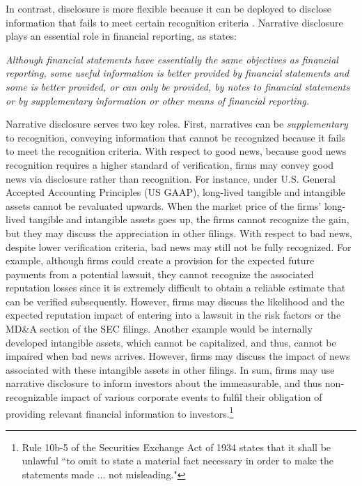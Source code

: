 \documentclass[letterpaper,12pt]{article}
\begin{document}
\begin{spacing}{1.5}
In contrast, disclosure is more flexible because it can be deployed to disclose information that fails to meet certain recognition criteria \cite[par. 7b]{fasbStatementFinancialAccounting1984}. Narrative disclosure plays an essential role in financial reporting, as  states:
\begin{adjustwidth}{1cm}{1cm}
\begin{singlespace}
	\textit{Although financial statements have essentially the same objectives as financial reporting, some useful information is better provided by financial statements and some is better provided, or can only be provided, by notes to financial statements or by supplementary information or other means of financial reporting.}
\end{singlespace}
\end{adjustwidth}

Narrative disclosure serves two key roles. First, narratives can be \textit{supplementary} to recognition, conveying information that cannot be recognized because it fails to meet the recognition criteria. With respect to good news, because good news recognition requires a higher standard of verification, firms may convey good news via disclosure rather than recognition. For instance, under U.S. General Accepted Accounting Principles (US GAAP), long-lived tangible and intangible assets cannot be revaluated upwards. When the market price of the firms' long-lived tangible and intangible assets goes up, the firms cannot recognize the gain, but they may discuss the appreciation in other filings. With respect to bad news, despite lower verification criteria, bad news may still not be fully recognized. For example, although firms could create a provision for the expected future payments from a potential lawsuit, they cannot recognize the associated reputation losses since it is extremely difficult to obtain a reliable estimate that can be verified subsequently. However, firms may discuss the likelihood and the expected reputation impact of entering into a lawsuit in the risk factors or the MD\&A section of the SEC filings. Another example would be internally developed intangible assets, which cannot be capitalized, and thus, cannot be impaired when bad news arrives. However, firms may discuss the impact of news associated with these intangible assets in other filings. In sum, firms may use narrative disclosure to inform investors about the immeasurable, and thus non-recognizable impact of various corporate events to fulfil their obligation of providing relevant financial information to investors.\footnote{Rule 10b-5 of the Securities Exchange Act of 1934 states that it shall be unlawful ``to omit to state a material fact necessary in order to make the statements made ... not misleading."} 


\end{spacing}
\end{document}
